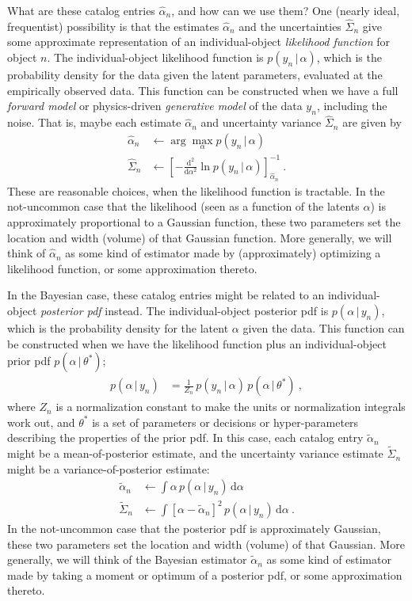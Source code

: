 \documentclass[10pt]{article}
\newcommand{\given}{\,|\,}
\newcommand{\dd}{\mathrm{d}}
\begin{document}
What are these catalog entries $\hat{\alpha}_n$, and how can we use them?
One (nearly ideal, frequentist) possibility is that the estimates $\hat{\alpha}_n$ and the uncertainties $\hat{\Sigma}_n$ give some approximate representation of an individual-object \emph{likelihood function} for object $n$.
The individual-object likelihood function is $p(y_n\given\alpha)$, which is the probability density for the data given the latent parameters, evaluated at the empirically observed data.
This function can be constructed when we have a full \emph{forward model} or physics-driven \emph{generative model} of the data $y_n$, including the noise.
That is, maybe each estimate $\hat{\alpha}_n$ and uncertainty variance $\hat{\Sigma}_n$ are given by
\begin{align}
    \hat{\alpha}_n & \leftarrow \arg\max_{\alpha} p(y_n\given\alpha) \\
    \hat{\Sigma}_n & \leftarrow \left[-\frac{\dd^2}{\dd\alpha^2}\ln p(y_n\given\alpha)\right]_{\hat{\alpha}_n}^{-1} ~.
\end{align}
These are reasonable choices, when the likelihood function is tractable.
In the not-uncommon case that the likelihood (seen as a function of the latents $\alpha$) is approximately proportional to a Gaussian function, these two parameters set the location and width (volume) of that Gaussian function.
More generally, we will think of $\hat{\alpha}_n$ as some kind of estimator made by (approximately) optimizing a likelihood function, or some approximation thereto.

In the Bayesian case, these catalog entries might be related to an individual-object \emph{posterior pdf} instead.
The individual-object posterior pdf is $p(\alpha\given y_n)$, which is the probability density for the latent $\alpha$ given the data.
This function can be constructed when we have the likelihood function plus an individual-object prior pdf $p(\alpha\given\theta^\ast)$;
\begin{align}
    p(\alpha\given y_n) &= \frac{1}{Z_n}\,p(y_n\given\alpha)\,p(\alpha\given\theta^\ast) ~,
\end{align}
where $Z_n$ is a normalization constant to make the units or normalization integrals work out,
and $\theta^\ast$ is a set of parameters or decisions or hyper-parameters describing the properties of the prior pdf.
In this case, each catalog entry $\tilde{\alpha}_n$ might be a mean-of-posterior estimate, and the uncertainty variance estimate $\tilde{\Sigma}_n$ might be a variance-of-posterior estimate:
\begin{align}
    \tilde{\alpha}_n & \leftarrow \int \alpha\,p(\alpha\given y_n)\,\dd\alpha \\
    \tilde{\Sigma}_n & \leftarrow \int [\alpha - \tilde{\alpha}_n]^2\,p(\alpha\given y_n)\,\dd\alpha ~.
\end{align}
In the not-uncommon case that the posterior pdf is approximately Gaussian, these two parameters set the location and width (volume) of that Gaussian.
More generally, we will think of the Bayesian estimator $\tilde{\alpha}_n$ as some kind of estimator made by taking a moment or optimum of a posterior pdf, or some approximation thereto.
\end{document}
